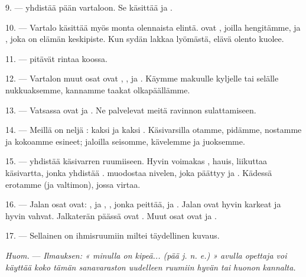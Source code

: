 \VUsaut{4.4mm}
\VUsaut{3.0mm}

9. ---  yhdistää pään vartaloon. Se käsittää  ja
.

10. --- Vartalo käsittää myös monta olennaista elintä.  ovat
, joilla hengitämme, ja , joka on elämän
keskipiste. Kun sydän lakkaa lyömästä, elävä olento kuolee.

11. ---  pitävät rintaa koossa.

12. --- Vartalon muut osat ovat , ,
 ja . Käymme makuulle kyljelle tai selälle
nukkuaksemme, kannamme taakat olkapäällämme.

13. --- Vatsassa ovat  ja . Ne palvelevat meitä
ravinnon sulattamiseen.

\VUsaut{4.4mm}
\VUsaut{3.0mm}

14. --- Meillä on neljä : kaksi  ja kaksi
. Käsivarsilla otamme, pidämme, nostamme ja kokoamme esineet;
jaloilla seisomme, kävelemme ja juoksemme.

15. ---  yhdistää käsivarren ruumiiseen. Hyvin voimakas
, hauis, liikuttaa käsivartta, jonka  yhdistää
.  muodostaa  nivelen, joka
päättyy  ja . Kädessä erotamme
 (ja valtimon), jossa  virtaa.

16. --- Jalan osat ovat: ,  ja
, , jonka   peittää,
 ja . Jalan  ovat hyvin karkeat ja
hyvin vahvat. Jalkaterän päässä ovat . Muut osat ovat
 ja .

17. --- Sellainen on ihmisruumiin miltei täydellinen kuvaus.

\textit{Huom.} --- \textit{Ilmauksen: « minulla on kipeä... (pää j. n. e.) »
avulla opettaja voi käyttää koko tämän sanavaraston uudelleen ruumiin hyvän tai
huonon}  \textit{kannalta.}

\VUsaut{5.0mm}
\VUsaut{2.4mm}
\VUsaut{3.0mm}

